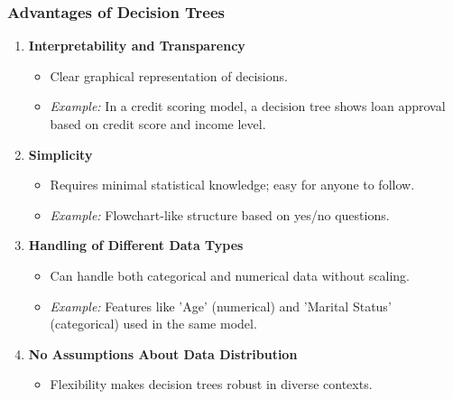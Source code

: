 \documentclass{beamer}
\begin{document}
\begin{frame}[fragile]
    \frametitle{Advantages of Decision Trees}
    \begin{enumerate}
        \item \textbf{Interpretability and Transparency}
        \begin{itemize}
            \item Clear graphical representation of decisions.
            \item \textit{Example:} In a credit scoring model, a decision tree shows loan approval based on credit score and income level.
        \end{itemize}
    
        \item \textbf{Simplicity}
        \begin{itemize}
            \item Requires minimal statistical knowledge; easy for anyone to follow.
            \item \textit{Example:} Flowchart-like structure based on yes/no questions.
        \end{itemize}
    
        \item \textbf{Handling of Different Data Types}
        \begin{itemize}
            \item Can handle both categorical and numerical data without scaling.
            \item \textit{Example:} Features like 'Age' (numerical) and 'Marital Status' (categorical) used in the same model.
        \end{itemize}
    
        \item \textbf{No Assumptions About Data Distribution}
        \begin{itemize}
            \item Flexibility makes decision trees robust in diverse contexts.
        \end{itemize}
    \end{enumerate}
\end{frame}
\end{document}
